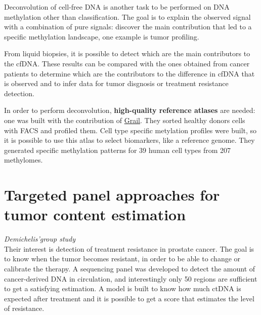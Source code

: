 Deconvolution of cell-free DNA is another task to be performed on DNA
methylation other than classification. The goal is to explain the observed
signal with a combination of pure signals: discover the main contribution that
led to a specific methylation landscape, one example is tumor profiling. 

From liquid biopsies, it is possible to detect which are the main contributors
to the cfDNA. These results can be compared with the ones obtained from cancer
patients to determine which are the contributors to the difference in cfDNA that
is observed and to infer data for tumor disgnosis or treatment resistance
detection.

In order to perform deconvolution, \textbf{high-quality reference atlases} are
needed: one was built with the contribution of
\href{https://www.biorxiv.org/content/10.1101/2022.01.24.477547v1}{Grail}. They
sorted healthy donors cells with FACS and profiled them. Cell type specific
metylation profiles were built, so it is possible to use this atlas to select
biomarkers, like a reference genome. They generated specific methylation
patterns for 39 human cell types from 207 methylomes. 

\section{Targeted panel approaches for tumor content estimation}
\textit{Demichelis'group study}\\

Their interest is detection of treatment resistance in prostate cancer. The goal
is to know when the tumor becomes resistant, in order to be able to change or
calibrate the therapy. A sequencing panel was developed to detect the amount of
cancer-derived DNA in circulation, and interestingly only 50 regions are
sufficient to get a satisfying estimation. A model is built to know how much
ctDNA is expected after treatment and it is possible to get a score that
estimates the level of resistance.
